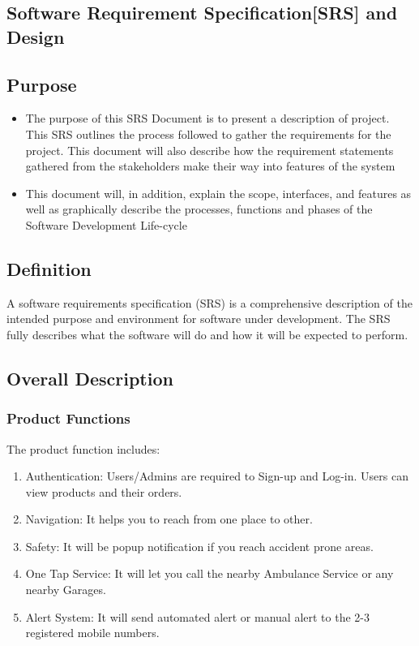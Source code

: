 \documentclass{article}
\begin{document}
\begin{flushleft}
    \section{Software Requirement Specification[SRS] and Design}
        \subsection{Purpose}
        \begin{itemize}
            \item The purpose of this SRS Document is to present a description of project. This SRS outlines the process followed to gather the requirements for the project. This document will also describe how the requirement statements gathered from the stakeholders make their way into features of the system
            \item This document will, in addition, explain the scope, interfaces, and features as well as graphically describe the processes, functions and phases of the Software Development Life-cycle
        \end{itemize}
        \subsection{Definition}
        A software requirements specification (SRS) is a comprehensive description of the intended purpose and environment for software under development. The SRS fully describes what the software will do and how it will be expected to perform. 
        \subsection{Overall Description}
            \subsubsection{Product Functions}
            The product function includes: 
            \begin{enumerate}
                \item Authentication: Users/Admins are required to Sign-up and Log-in. Users can view products and their orders.
                \item Navigation: It helps you to reach from one place to other.
                \item Safety: It will be popup notification if you reach accident prone areas.
                \item One Tap Service: It will let you call the nearby Ambulance Service or any nearby Garages.
                \item Alert System: It will send automated alert or manual alert to the 2-3 registered mobile numbers.
            \end{enumerate}
            

\end{flushleft}
\end{document}
